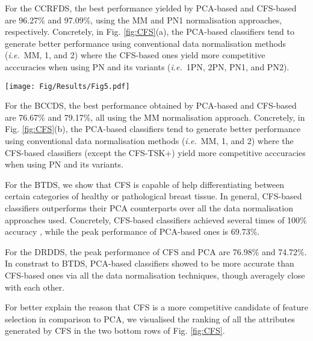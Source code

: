 \documentclass{article}
\newcommand{\zzie}{\emph{i.e.}~}
\newcommand*{\1}{\textcolor{red}}
\begin{document}
For the CCRFDS, the best performance yielded by PCA-based and CFS-based are 96.27\% and 97.09\%, using the MM and PN1 normalisation approaches, respectively. Concretely, in Fig. \ref{fig:CFS}(a), the PCA-based classifiers tend to generate better performance using conventional data normalisation methods (\zzie MM, 1, and 2) where the CFS-based ones yield more competitive acccuracies when using PN and its variants (\zzie 1PN, 2PN, PN1, and PN2).

\begin{figure*}
	\centering
	\texttt{[image: Fig/Results/Fig5.pdf]}
	\caption{Classification accuracies of PCA and CFS feature selection methods on four EHR data sets by varying both feature normalisation methods and classifiers. Leftmost column shows the detailed classification performance, second column further summarises the corresponding statistics, and rightmost columns lists the feature rankings provided by CFS in a descending order over each data set for intuitive explainability. Best viewed in colour.}
	\label{fig:CFS}
\end{figure*}

For the BCCDS, the best performance obtained by PCA-based and CFS-based are 76.67\% and 79.17\%, all using the MM normalisation approach. Concretely, in Fig. \ref{fig:CFS}(b), the PCA-based classifiers tend to generate better performance using conventional data normalisation methods (\zzie MM, 1, and 2) where the CFS-based classifiers (except the CFS-TSK+) yield more competitive acccuracies when using PN and its variants.

For the BTDS, we show that CFS is capable of help differentiating between certain categories of healthy or pathological breast tissue. In general, CFS-based classifiers outperforms their PCA counterparts over all the data normalisation approaches used. Concretely, CFS-based classifiers achieved several times of 100\% accuracy , while the peak performance of PCA-based ones is 69.73\%.

For the DRDDS, the peak performance of CFS and PCA are 76.98\% and 74.72\%. In constrast to BTDS, PCA-based classifiers showed to be more accurate than CFS-based ones via all the data normalisation techniques, though averagely close with each other.

For better explain the reason that CFS is a more competitive candidate of feature selection in comparison to PCA, we visualised the ranking of all the attributes generated by CFS in the two bottom rows of Fig. \ref{fig:CFS}. 
\end{document}
